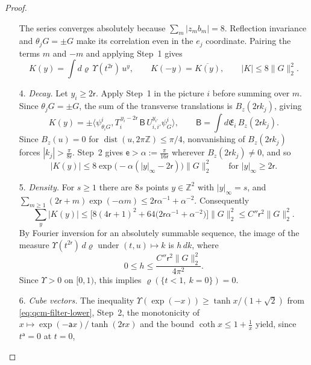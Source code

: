 \documentclass[11pt,letterpaper,reqno]{amsart}
\theoremstyle{definition}
\begin{document}
\begin{proof}
\begin{enumerate}
\begin{equation*}
\end{equation*}
The series converges absolutely because $\sum_m|z_mb_m|=8$. Reflection invariance and $\theta_jG=\pm G$ make its correlation even in the $e_j$ coordinate. Pairing the terms $m$ and $-m$ and applying Step~1 gives
\begin{equation*}
K(y)=\int d\varrho\,\Upsilon(t^{2\mathsf r})\,u^y,\qquad K(-y)=\overline{K(y)},\qquad|K|\le8\|G\|_2^2.
\end{equation*}
\item[4.] \emph{Decay.}
Let $y_i\ge2\mathsf r$.
Apply Step~1 in the picture $i$ before summing over $m$. Since $\theta_jG=\pm G$, the sum of the transverse translations is $B_z(2\mathsf r k_j)$, giving
\begin{equation*}
K(y)=\pm\bigl\langle\psi^i_{\theta_iG},T_i^{\,y_i-2\mathsf r}\,\mathsf B\,U_{i,i'}^{y_{i'}}\psi^i_G\bigr\rangle,\qquad\mathsf B=\int d\mathfrak E_i\,B_z(2\mathsf rk_j).
\end{equation*}
Since $B_z(u)=0$ for $\operatorname{dist}(u,2\pi\mathbb Z)\le\pi/4$, nonvanishing of $B_z(2\mathsf rk_j)$ forces $|k_j|>\frac{\pi}{8\mathsf r}$. Step~2 gives $\mathsf e>\alpha:=\frac{\pi}{16\mathsf r}$ wherever $B_z(2\mathsf rk_j)\ne0$, and so
\begin{equation*}
|K(y)|\le8\exp\bigl(-\alpha(|y|_\infty-2\mathsf r)\bigr)\|G\|_2^2\qquad\text{for }|y|_\infty\ge2\mathsf r.
\end{equation*}
\item[5.] \emph{Density.}
For $s\ge1$ there are $8s$ points $y\in\mathbb Z^2$ with $|y|_\infty=s$, and $\sum_{m\ge1}(2\mathsf r+m)\exp(-\alpha m)\le2\mathsf r\alpha^{-1}+\alpha^{-2}$.
Consequently
\begin{equation*}
\sum_y|K(y)|\le\bigl[8(4\mathsf r+1)^2+64\bigl(2\mathsf r\alpha^{-1}+\alpha^{-2}\bigr)\bigr]\|G\|_2^2\le C''\mathsf r^2\|G\|_2^2.
\end{equation*}
By Fourier inversion for an absolutely summable sequence, the image of the measure $\Upsilon(t^{2\mathsf r})\,d\varrho$ under $(t,u)\mapsto k$ is $h\,dk$, where
\begin{equation*}
0\le h\le\frac{C''\mathsf r^2\|G\|_2^2}{4\pi^2}.
\end{equation*}
Since $\Upsilon>0$ on $[0,1)$, this implies $\varrho(\{t<1,\ k=0\})=0$.
\item[6.] \emph{Cube vectors.}
The inequality $\Upsilon(\exp(-x))\ge\tanh x/(1+\sqrt2)$ from \eqref{eq:qcm-filter-lower}, Step~2, the monotonicity of $x\mapsto\exp(-\mathsf ax)/\tanh(2\mathsf rx)$ and the bound $\coth x\le1+\frac1x$ yield, since $t^{\mathsf a}=0$ at $t=0$,

\end{enumerate}
\end{proof}
\end{document}
